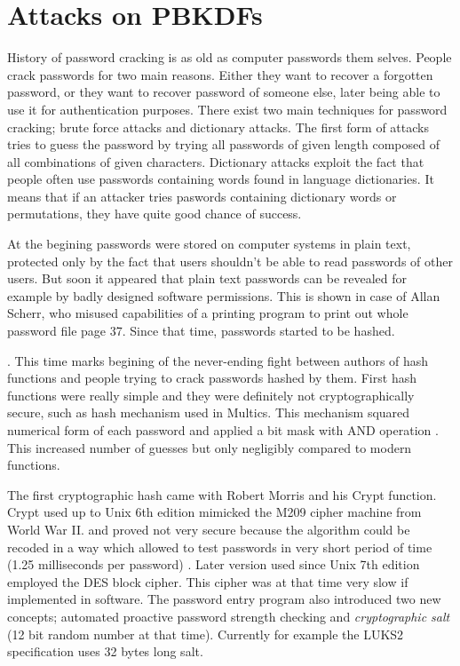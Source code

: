 \documentclass[nolof]{fithesis3}
\begin{document}
\section{Attacks on PBKDFs}
\label{sec:attacks}
History of password cracking is as old as computer passwords them selves. People crack passwords for two main reasons. Either they want to recover a forgotten password, or they want to recover password of someone else, later being able to use it for authentication purposes. There exist two main techniques for password cracking; brute force attacks and dictionary attacks. The first form of attacks tries to guess the password by trying all passwords of given length composed of all combinations of given characters. Dictionary attacks exploit the fact that people often use passwords containing words found in language dictionaries. It means that if an attacker tries paswords containing dictionary words or permutations, they have quite good chance of success.

At the begining passwords were stored on computer systems in plain text, protected only by the fact that users shouldn't be able to read passwords of other users. But soon it appeared that plain text passwords can be revealed for example by badly designed software permissions. This is shown in case of Allan Scherr, who misused capabilities of a printing program to print out whole password file \parencite{ctss}{}{page 37}. Since that time, passwords started to be hashed.

. This time marks begining of the never-ending fight between authors of hash functions and people trying to crack passwords hashed by them. First hash functions were really simple and they were definitely not cryptographically secure, such as hash mechanism used in Multics. This mechanism squared numerical form of each password and applied a bit mask with AND operation \parencite{multicssecurity}. This increased number of guesses but only negligibly compared to modern functions.

The first cryptographic hash came with Robert Morris and his Crypt function. Crypt used up to Unix 6th edition mimicked the M209 cipher machine from World War II. and proved not very secure because the algorithm could be recoded in a way which allowed to test passwords in very short period of time (1.25 milliseconds per password) \parencite{pshistory}. Later version used since Unix 7th edition employed the DES block cipher. This cipher was at that time very slow if implemented in software. The password entry program also introduced two new concepts; automated proactive password strength checking and \emph{cryptographic salt} (12 bit random number at that time). Currently for example the LUKS2 specification uses 32 bytes long salt.
\end{document}
